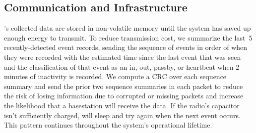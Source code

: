 \subsection{Communication and Infrastructure}
\sysname's collected data are stored in non-volatile memory until the system has saved up enough energy to transmit.
To reduce transmission cost, we summarize the last~5 recently-detected event records, sending the sequence of events in order of when they were recorded with the estimated time since the last event that was seen and the classification of that event as an in, out, passby, or heartbeat when 2 minutes of inactivity is recorded.
We compute a CRC over each sequence summary and send the prior two sequence summaries in each packet to reduce the risk of losing information due to corrupted or missing packets and increase the likelihood that a basestation will receive the data. 
If the radio's capacitor isn't sufficiently charged, \sysname will sleep and try again when the next event occurs.
This pattern continues throughout the system's operational lifetime.


